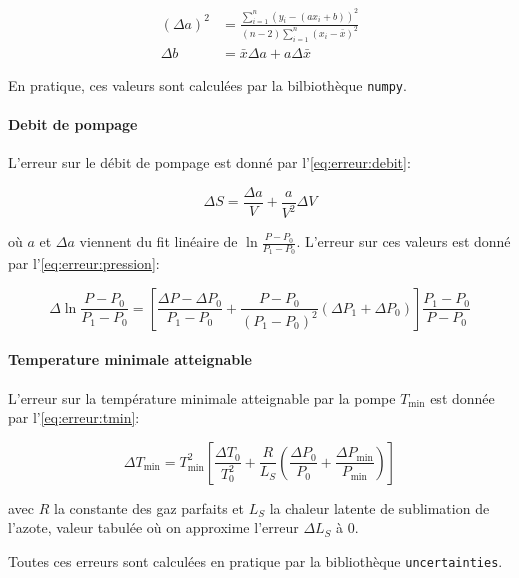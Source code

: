 \begin{equation}
    \label{eq:erreur:fit}
    \begin{aligned}
        (\Delta a)^2 &= \frac{\sum_{i=1}^{n}(y_i - (a x_i + b))^2}{(n-2) \sum_{i=1}^{n}(x_i - \bar{x})^2}\\
        \Delta b &= \bar{x} \Delta a + a \Delta \bar{x}
    \end{aligned}
\end{equation}

En pratique, ces valeurs sont calculées par la bilbiothèque \texttt{numpy}.

\paragraph*{Debit de pompage}
L'erreur sur le débit de pompage est donné par l'\autoref{eq:erreur:debit}:

\begin{equation}
    \Delta S = \frac{\Delta a}{V} + \frac{a}{V^2} \Delta V
    \label{eq:erreur:debit}
\end{equation}

où \(a\) et \(\Delta a\) viennent du fit linéaire de \(\ln{\frac{P - P_0}{P_1 - P_0}}\). L'erreur sur ces valeurs est donné par l'\autoref{eq:erreur:pression}:

\begin{equation}
    \Delta \ln{\frac{P - P_0}{P_1 - P_0}} = \left[\frac{\Delta P - \Delta P_0}{P_1 - P_0} + \frac{P - P_0}{(P_1 - P_0)^2}(\Delta P_1 + \Delta P_0)\right] \frac{P_1 - P_0}{P - P_0}
    \label{eq:erreur:pression}
\end{equation}


\paragraph*{Temperature minimale atteignable}
L'erreur sur la température minimale atteignable par la pompe \(T_\textrm{min}\) est donnée par l'\autoref{eq:erreur:tmin}:

\begin{equation}
    \Delta T_\textrm{min} = T_\textrm{min}^2\left[\frac{\Delta T_0}{T_0^2} + \frac{R}{L_S}\left(\frac{\Delta P_0}{P_0} + \frac{\Delta P_\textrm{min}}{P_\textrm{min}}\right)\right]
    \label{eq:erreur:tmin}
\end{equation}

avec \(R\) la constante des gaz parfaits et \(L_S\) la chaleur latente de sublimation de l'azote, valeur tabulée où on approxime l'erreur \(\Delta L_S\) à 0.

Toutes ces erreurs sont calculées en pratique par la bibliothèque \texttt{uncertainties}.
